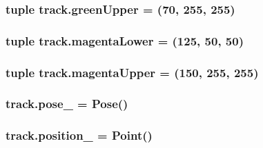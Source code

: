 \subsubsection[{\texorpdfstring{green\+Upper}{greenUpper}}]{\setlength{\rightskip}{0pt plus 5cm}tuple track.\+green\+Upper = (70, 255, 255)}\hypertarget{namespacetrack_a2a45da69392a010f85aa42de064d7c85}{}\label{namespacetrack_a2a45da69392a010f85aa42de064d7c85}
\subsubsection[{\texorpdfstring{magenta\+Lower}{magentaLower}}]{\setlength{\rightskip}{0pt plus 5cm}tuple track.\+magenta\+Lower = (125, 50, 50)}\hypertarget{namespacetrack_a4778acbcac36117d4384a64aff1283bd}{}\label{namespacetrack_a4778acbcac36117d4384a64aff1283bd}
\subsubsection[{\texorpdfstring{magenta\+Upper}{magentaUpper}}]{\setlength{\rightskip}{0pt plus 5cm}tuple track.\+magenta\+Upper = (150, 255, 255)}\hypertarget{namespacetrack_a159d6ddb51827712e530f1f1e59369c7}{}\label{namespacetrack_a159d6ddb51827712e530f1f1e59369c7}
\subsubsection[{\texorpdfstring{pose\+\_\+}{pose_}}]{\setlength{\rightskip}{0pt plus 5cm}track.\+pose\+\_\+ = Pose()}\hypertarget{namespacetrack_a4fcc239004d2df0fe5a4ea23c9b0495f}{}\label{namespacetrack_a4fcc239004d2df0fe5a4ea23c9b0495f}
\subsubsection[{\texorpdfstring{position\+\_\+}{position_}}]{\setlength{\rightskip}{0pt plus 5cm}track.\+position\+\_\+ = Point()}\hypertarget{namespacetrack_a7299b48bcf1df87418078ead7079339d}{}\label{namespacetrack_a7299b48bcf1df87418078ead7079339d}
